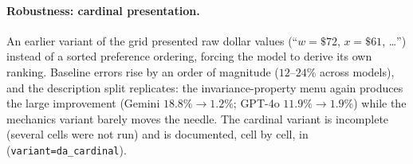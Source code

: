 \paragraph{Robustness: cardinal presentation.} An earlier variant of the grid presented raw dollar values (``$w = \$72$, $x = \$61$, \ldots'') instead of a sorted preference ordering, forcing the model to derive its own ranking. Baseline errors rise by an order of magnitude ($12$--$24\%$ across models), and the description split replicates: the invariance-property menu again produces the large improvement (Gemini $18.8\% \to 1.2\%$; GPT-4o $11.9\% \to 1.9\%$) while the mechanics variant barely moves the needle. The cardinal variant is incomplete (several cells were not run) and is documented, cell by cell, in  (\texttt{variant=da\_cardinal}).
